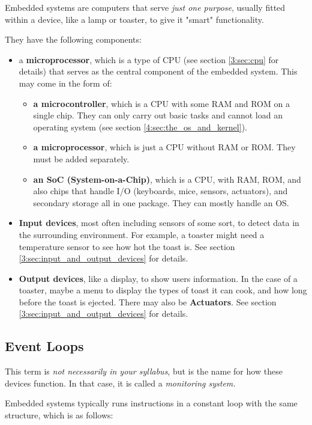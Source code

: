 \documentclass[../main.tex]{subfiles}
\begin{document}
Embedded systems are computers that serve \emph{just one purpose}, usually fitted within a device, like a lamp or toaster, to give it "smart" functionality.

They have the following components:

\begin{itemize}
    \item a \textbf{microprocessor}, which is a type of CPU (see section \ref{3:sec:cpu} for details) that serves as the central component of the embedded system. This may come in the form of:
        \begin{itemize}
            \item \textbf{a microcontroller}, which is a CPU with some RAM and ROM on a single chip. They can only carry out basic tasks and cannot load an operating system (see section \ref{4:sec:the_os_and_kernel}).
            \item \textbf{a microprocessor}, which is just a CPU without RAM or ROM. They must be added separately.
            \item \textbf{an SoC (System-on-a-Chip)}, which is a CPU, with RAM, ROM, and also chips that handle I/O (keyboards, mice, sensors, actuators), and secondary storage all in one package. They can mostly handle an OS.
        \end{itemize}
    \item \textbf{Input devices}, most often including sensors of some sort, to detect data in the surrounding environment. For example, a toaster might need a temperature sensor to see how hot the toast is. See section \ref{3:sec:input_and_output_devices} for details.
    \item \textbf{Output devices}, like a display, to show users information. In the case of a toaster, maybe a menu to display the types of toast it can cook, and how long before the toast is ejected. There may also be \textbf{Actuators}. See section \ref{3:sec:input_and_output_devices} for details.
\end{itemize}

\subsection{Event Loops}

This term is \emph{not necessarily in your syllabus}, but is the name for how these devices function. In that case, it is called a \emph{monitoring system.}

Embedded systems typically runs instructions in a constant loop with the same structure, which is as follows:
\end{document}
